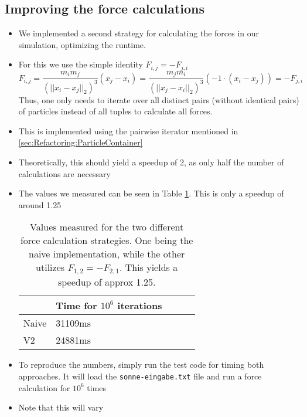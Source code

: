 \documentclass{article}
\begin{document}
\subsection{Improving the force calculations}
\label{sec:Refactoring:forceimprovements}

\begin{itemize}
    \item We implemented a second strategy for calculating the forces in our simulation, optimizing the runtime.
    \item For this we use the simple identity $F_{i,j} = -F_{j,i}$
        \begin{equation}
            F_{i,j} = \frac{m_im_j}{(||x_i-x_j||_2)^3} (x_j - x_i) = \frac{m_jm_i}{(||x_j-x_i||_2)^3} \left(-1 \cdot \left(x_i - x_j\right)\right) = - F_{j,i} 
        \end{equation}
        Thus, one only needs to iterate over all distinct pairs (without identical pairs) of particles instead of all tuples to calculate all forces.
    \item This is implemented using the pairwise iterator mentioned in \ref{sec:Refactoring:ParticleContainer}
    \item Theoretically, this should yield a speedup of 2, as only half the number of calculations are necessary
    \item The values we measured can be seen in Table \ref{tab:speedup}. This is only a speedup of around 1.25
        \begin{table}[H]
            \centering
            \begin{tabular}{|l|l|l|l|l|}
            \hline
                & Time for $10^6$ iterations \\ \hline
            Naive & 31109ms                  \\ \hline
            V2    & 24881ms                  \\ \hline
            \end{tabular}
            \caption{Values measured for the two different force calculation strategies. One being the naive implementation, while the other utilizes $F_{1,2} = - F_{2,1}$. This yields a speedup of approx 1.25.}
            \label{tab:speedup}
        \end{table}
    \item To reproduce the numbers, simply run the test code for timing both approaches. It will load the \verb|sonne-eingabe.txt| file and run a force calculation for $10^6$ times
    \item Note that this will vary
\end{itemize}
\end{document}
